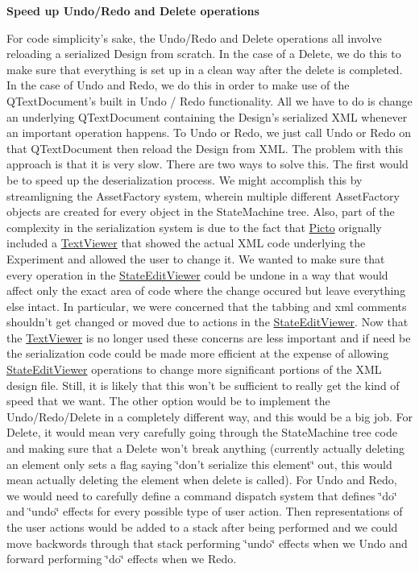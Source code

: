 {\bfseries Speed up Undo/\-Redo and Delete operations}\par
 For code simplicity's sake, the Undo/\-Redo and Delete operations all involve reloading a serialized Design from scratch. In the case of a Delete, we do this to make sure that everything is set up in a clean way after the delete is completed. In the case of Undo and Redo, we do this in order to make use of the Q\-Text\-Document's built in Undo / Redo functionality. All we have to do is change an underlying Q\-Text\-Document containing the Design's serialized X\-M\-L whenever an important operation happens. To Undo or Redo, we just call Undo or Redo on that Q\-Text\-Document then reload the Design from X\-M\-L. The problem with this approach is that it is very slow. There are two ways to solve this. The first would be to speed up the deserialization process. We might accomplish this by streamligning the Asset\-Factory system, wherein multiple different Asset\-Factory objects are created for every object in the State\-Machine tree. Also, part of the complexity in the serialization system is due to the fact that \hyperlink{namespace_picto}{Picto} orignally included a \hyperlink{class_text_viewer}{Text\-Viewer} that showed the actual X\-M\-L code underlying the Experiment and allowed the user to change it. We wanted to make sure that every operation in the \hyperlink{class_state_edit_viewer}{State\-Edit\-Viewer} could be undone in a way that would affect only the exact area of code where the change occured but leave everything else intact. In particular, we were concerned that the tabbing and xml comments shouldn't get changed or moved due to actions in the \hyperlink{class_state_edit_viewer}{State\-Edit\-Viewer}. Now that the \hyperlink{class_text_viewer}{Text\-Viewer} is no longer used these concerns are less important and if need be the serialization code could be made more efficient at the expense of allowing \hyperlink{class_state_edit_viewer}{State\-Edit\-Viewer} operations to change more significant portions of the X\-M\-L design file. Still, it is likely that this won't be sufficient to really get the kind of speed that we want. The other option would be to implement the Undo/\-Redo/\-Delete in a completely different way, and this would be a big job. For Delete, it would mean very carefully going through the State\-Machine tree code and making sure that a Delete won't break anything (currently actually deleting an element only sets a flag saying \char`\"{}don't serialize this element\char`\"{} out, this would mean actually deleting the element when delete is called). For Undo and Redo, we would need to carefully define a command dispatch system that defines \char`\"{}do\char`\"{} and \char`\"{}undo\char`\"{} effects for every possible type of user action. Then representations of the user actions would be added to a stack after being performed and we could move backwords through that stack performing \char`\"{}undo\char`\"{} effects when we Undo and forward performing \char`\"{}do\char`\"{} effects when we Redo.

